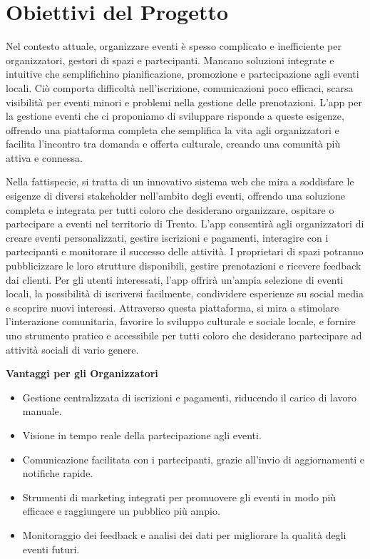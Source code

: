 \documentclass[9pt]{extarticle}
\begin{document}
\customtitle



\tableofcontents
\newpage

\section{Obiettivi del Progetto}

Nel contesto attuale, organizzare eventi è spesso complicato e inefficiente per organizzatori, gestori di spazi e partecipanti. Mancano soluzioni integrate e intuitive che semplifichino pianificazione, promozione e partecipazione agli eventi locali. Ciò comporta difficoltà nell'iscrizione, comunicazioni poco efficaci, scarsa visibilità per eventi minori e problemi nella gestione delle prenotazioni. L'app per la gestione eventi che ci proponiamo di sviluppare risponde a queste esigenze, offrendo una piattaforma completa che semplifica la vita agli organizzatori e facilita l'incontro tra domanda e offerta culturale, creando una comunità più attiva e connessa.

Nella fattispecie, si tratta di un innovativo sistema web che mira a soddisfare le esigenze di diversi stakeholder nell'ambito degli eventi, offrendo una soluzione completa e integrata per tutti coloro che desiderano organizzare, ospitare o partecipare a eventi nel territorio di Trento. L'app consentirà agli organizzatori di creare eventi personalizzati, gestire iscrizioni e pagamenti, interagire con i partecipanti e monitorare il successo delle attività. I proprietari di spazi potranno pubblicizzare le loro strutture disponibili, gestire prenotazioni e ricevere feedback dai clienti. Per gli utenti interessati, l'app offrirà un'ampia selezione di eventi locali, la possibilità di iscriversi facilmente, condividere esperienze su social media e scoprire nuovi interessi. Attraverso questa piattaforma, si mira a stimolare l'interazione comunitaria, favorire lo sviluppo culturale e sociale locale, e fornire uno strumento pratico e accessibile per tutti coloro che desiderano partecipare ad attività sociali di vario genere.

\textbf{Vantaggi per gli Organizzatori}
\begin{itemize}
	\item Gestione centralizzata di iscrizioni e pagamenti, riducendo il carico di lavoro manuale.
	\item Visione in tempo reale della partecipazione agli eventi.
	\item Comunicazione facilitata con i partecipanti, grazie all'invio di aggiornamenti e notifiche rapide.
	\item Strumenti di marketing integrati per promuovere gli eventi in modo più efficace e raggiungere un pubblico più ampio.
	\item Monitoraggio dei feedback e analisi dei dati per migliorare la qualità degli eventi futuri.
\end{itemize}
\end{document}
